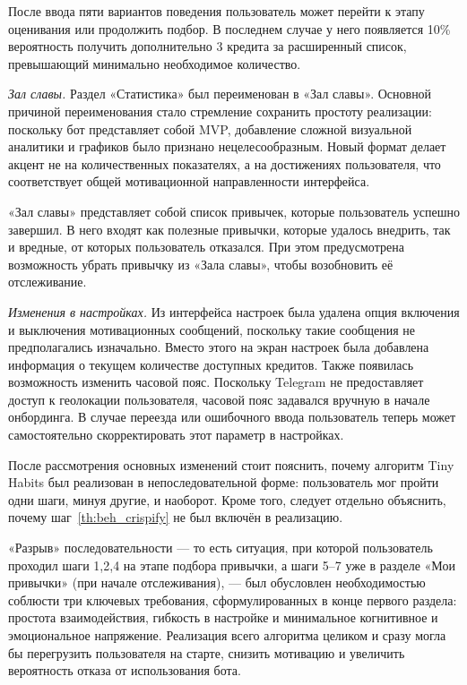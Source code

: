 \documentclass[pdflatex,sn-mathphys-num]{sn-jnl}%
\theoremstyle{thmstyleone}%
\theoremstyle{thmstyletwo}%
\theoremstyle{thmstylethree}%
\begin{document}
После ввода пяти вариантов поведения пользователь может перейти к этапу оценивания или продолжить подбор. В последнем случае у него появляется 10\% вероятность получить дополнительно 3 кредита за расширенный список, превышающий минимально необходимое количество.

\textit{Зал славы.} Раздел «Статистика» был переименован в «Зал славы». Основной причиной переименования стало стремление сохранить простоту реализации: поскольку бот представляет собой MVP, добавление сложной визуальной аналитики и графиков было признано нецелесообразным. Новый формат делает акцент не на количественных показателях, а на достижениях пользователя, что соответствует общей мотивационной направленности интерфейса.

«Зал славы» представляет собой список привычек, которые пользователь успешно завершил. В него входят как полезные привычки, которые удалось внедрить, так и вредные, от которых пользователь отказался. При этом предусмотрена возможность убрать привычку из «Зала славы», чтобы возобновить её отслеживание.

\textit{Изменения в настройках.} Из интерфейса настроек была удалена опция включения и выключения мотивационных сообщений, поскольку такие сообщения не предполагались изначально. Вместо этого на экран настроек была добавлена информация о текущем количестве доступных кредитов. Также появилась возможность изменить часовой пояс. Поскольку Telegram не предоставляет доступ к геолокации пользователя, часовой пояс задавался вручную в начале онбординга. В случае переезда или ошибочного ввода пользователь теперь может самостоятельно скорректировать этот параметр в настройках.

После рассмотрения основных изменений стоит пояснить, почему алгоритм Tiny Habits был реализован в непоследовательной форме: пользователь мог пройти одни шаги, минуя другие, и наоборот. Кроме того, следует отдельно объяснить, почему шаг~\ref{th:beh_crispify} не был включён в реализацию.

«Разрыв» последовательности — то есть ситуация, при которой пользователь проходил шаги 1,2,4 на этапе подбора привычки, а шаги 5–7 уже в разделе «Мои привычки» (при начале отслеживания), — был обусловлен необходимостью соблюсти три ключевых требования, сформулированных в конце первого раздела: простота взаимодействия, гибкость в настройке и минимальное когнитивное и эмоциональное напряжение. Реализация всего алгоритма целиком и сразу могла бы перегрузить пользователя на старте, снизить мотивацию и увеличить вероятность отказа от использования бота.
\end{document}
